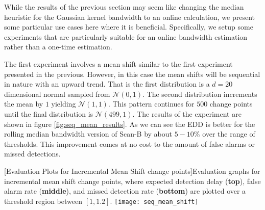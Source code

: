 While the results of the previous section may seem like changing the median heuristic for the Gaussian kernel bandwidth to an online calculation, we present some particular use cases here where it is beneficial. Specifically, we setup some experiments that are particularly suitable for an online bandwidth estimation rather than a one-time estimation.

The first experiment involves a mean shift similar to the first experiment presented in the previous. However, in this case the mean shifts will be sequential in nature with an upward trend. That is the first distribution is a $d=20$ dimensional normal sampled from $\mathcal{N}(0,1)$. The second distribution increments the mean by $1$ yielding $\mathcal{N}(1,1)$. This pattern continues for $500$ change points until the final distribution is $\mathcal{N}(499,1)$. The results of the experiment are shown in figure \ref{fig:seq_mean_results}. As we can see the EDD is better for the rolling median bandwidth version of Scan-B by about $5-10\%$ over the range of thresholds. This improvement comes at no cost to the amount of false alarms or missed detections.

\begin{center} 
[Evaluation Plots for Incremental Mean Shift change points]{Evaluation graphs for incremental mean shift change points, where expected detection delay (\textbf{top}), false alarm rate (\textbf{middle}), and missed detection rate (\textbf{bottom}) are plotted over a threshold region between $[1,1.2]$. } 
\texttt{[image: seq\_mean\_shift]} 
\label{fig:seq_mean_results} 
\end{center}